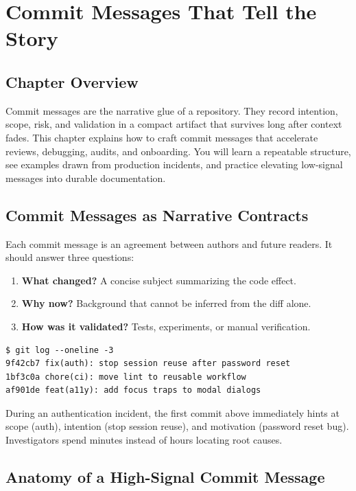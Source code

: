 \chapter{Commit Messages That Tell the Story}

\section{Chapter Overview}
Commit messages are the narrative glue of a repository. They record intention, scope, risk, and validation in a compact artifact that survives long after context fades. This chapter explains how to craft commit messages that accelerate reviews, debugging, audits, and onboarding. You will learn a repeatable structure, see examples drawn from production incidents, and practice elevating low-signal messages into durable documentation.

\section{Commit Messages as Narrative Contracts}
Each commit message is an agreement between authors and future readers. It should answer three questions:
\begin{enumerate}
  \item \textbf{What changed?} A concise subject summarizing the code effect.
  \item \textbf{Why now?} Background that cannot be inferred from the diff alone.
  \item \textbf{How was it validated?} Tests, experiments, or manual verification.
\end{enumerate}

\begin{lstlisting}[style=shell,caption={High-signal history tells the story behind incidents}]
$ git log --oneline -3
9f42cb7 fix(auth): stop session reuse after password reset
1bf3c0a chore(ci): move lint to reusable workflow
af901de feat(a11y): add focus traps to modal dialogs
\end{lstlisting}

During an authentication incident, the first commit above immediately hints at scope (auth), intention (stop session reuse), and motivation (password reset bug). Investigators spend minutes instead of hours locating root causes.

\section{Anatomy of a High-Signal Commit Message}
